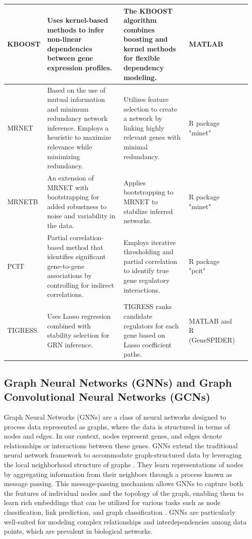 \documentclass{article}
\begin{document}
\begin{longtable}{|p{2cm}|p{5.5cm}|p{3.5cm}|p{2cm}|p{0.5cm}|}
KBOOST & Uses kernel-based methods to infer non-linear dependencies between gene expression profiles. & The KBOOST algorithm combines boosting and kernel methods for flexible dependency modeling. & MATLAB & \cite{kboost} \\ \hline
MRNET & Based on the use of mutual information and minimum redundancy network inference. Employs a heuristic to maximize relevance while minimizing redundancy. & Utilizes feature selection to create a network by linking highly relevant genes with minimal redundancy. & R package "minet" & \cite{minet} \\ \hline
MRNETB & An extension of MRNET with bootstrapping for added robustness to noise and variability in the data. & Applies bootstrapping to MRNET to stabilize inferred networks. & R package "minet" & \cite{minet} \\ \hline
PCIT & Partial correlation-based method that identifies significant gene-to-gene associations by controlling for indirect correlations. & Employs iterative thresholding and partial correlation to identify true gene regulatory interactions. & R package "pcit" & \cite{pcit} \\ \hline
TIGRESS & Uses Lasso regression combined with stability selection for GRN inference. & TIGRESS ranks candidate regulators for each gene based on Lasso coefficient paths. & MATLAB and R (GeneSPIDER) & \cite{tigress} \\ \hline
\end{longtable}


\subsection{Graph Neural Networks (GNNs) and Graph Convolutional Neural Networks (GCNs)}
Graph Neural Networks (GNNs) are a class of neural networks designed to process data represented as graphs, where the data is structured in terms of nodes and edges. In our context, nodes represent genes, and edges denote relationships or interactions between these genes. GNNs extend the traditional neural network framework to accommodate graph-structured data by leveraging the local neighborhood structure of graphs \cite{gcn_review}. They learn representations of nodes by aggregating information from their neighbors through a process known as message passing. This message-passing mechanism allows GNNs to capture both the features of individual nodes and the topology of the graph, enabling them to learn rich embeddings that can be utilized for various tasks such as node classification, link prediction, and graph classification \cite{passing}. GNNs are particularly well-suited for modeling complex relationships and interdependencies among data points, which are prevalent in biological networks.
\end{document}
